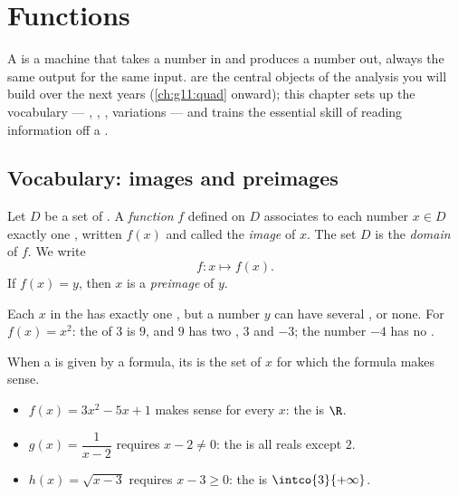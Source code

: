 \chapter{Functions}\label{ch:g10:functions}

A  is a machine that takes a number in and produces a number out,
always the same output for the same input.  are the central
objects of the analysis you will build over the next years
(\cref{ch:g11:quad} onward); this chapter sets up the vocabulary ---
, , , variations --- and trains the essential skill of
reading information off a .

\section{Vocabulary: images and preimages}

\begin{definition}[Function]\label{def:g10:functions:function}
Let $D$ be a set of . A \emph{function} $f$
defined on $D$ associates to each number $x \in D$ exactly one , written $f(x)$ and called the \emph{image} of $x$.
The set $D$ is the \emph{domain} of $f$. We write
\[
f : x \longmapsto f(x).
\]
If $f(x) = y$, then $x$ is a \emph{preimage} of $y$.
\end{definition}

\begin{remark}
Each $x$ in the  has exactly one , but a number $y$ can have
several , or none. For $f(x) = x^2$: the  of $3$ is $9$, and
$9$ has two , $3$ and $-3$; the number $-4$ has no .
\end{remark}

\begin{example}\label{ex:g10:functions:domain}
When a  is given by a formula, its  is the set of $x$ for
which the formula makes sense.
\begin{itemize}
  \item $f(x) = 3x^2 - 5x + 1$ makes sense for every $x$: the  is
        $\R$.
  \item $g(x) = \dfrac{1}{x - 2}$ requires $x - 2 \neq 0$: the  is
        all reals except $2$.
  \item $h(x) = \sqrt{x - 3}$ requires $x - 3 \geq 0$: the  is
        $\intco{3}{+\infty}$.
\end{itemize}
\end{example}

